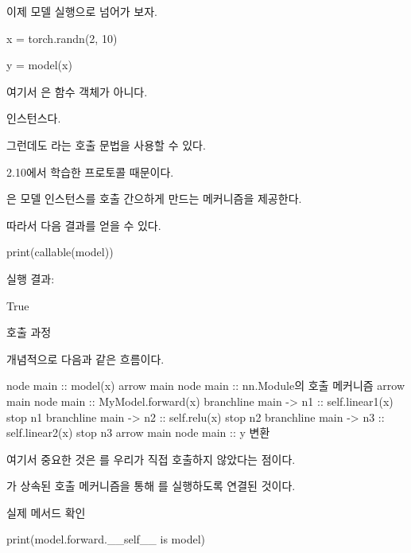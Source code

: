 이제 모델 실행으로 넘어가 보자.

\begin{dhkcode}
x = torch.randn(2, 10)

y = model(x)
\end{dhkcode}

여기서 은 함수 객체가 아니다.

 인스턴스다.

그런데도 라는 호출 문법을 사용할 수 있다.

2.10에서 학습한  프로토콜 때문이다.

은 모델 인스턴스를 호출 간으하게 만드는 메커니즘을 제공한다.

따라서 다음 결과를 얻을 수 있다.

\begin{dhkcode}
print(callable(model))
\end{dhkcode}

실행 결과:

\begin{dhkzsh}
True
\end{dhkzsh}

\begin{dhknote}
\begin{dhksmry}[centered]
호출 과정
\end{dhksmry}
\end{dhknote}

개념적으로 다음과 같은 흐름이다.

\begin{dhkbranch}[in=8]
node main :: model(x)
arrow main
node main :: nn.Module의 호출 메커니즘
arrow main
node main :: MyModel.forward(x)
branchline main -> n1 :: self.linear1(x)
stop n1
branchline main -> n2 :: self.relu(x)
stop n2
branchline main -> n3 :: self.linear2(x)
stop n3
arrow main
node main :: y 변환
\end{dhkbranch}

여기서 중요한 것은 를 우리가 직접 호출하지 않았다는 점이다.

가 상속된 호출 메커니즘을 통해 를 실행하도록 연결된 것이다.

\begin{dhknote}
\begin{dhksmry}[centered]
실제 메서드 확인
\end{dhksmry}
\end{dhknote}

\begin{dhkcode}
print(model.forward.__self__ is model)
\end{dhkcode}

